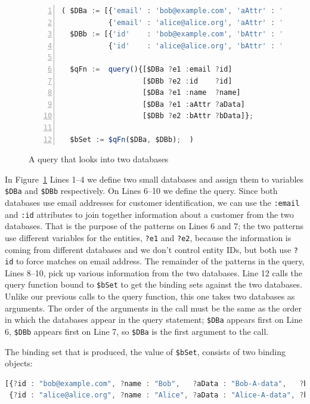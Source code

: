 \documentclass[10pt,letterpaper]{article} %
\newcommand{\stt}[1]{\texttt{#1}} %
\begin{document}
\begin{figure}[H]
    \caption{A query that looks into two databases}
    \label{code:two-database-query}
\begin{lstlisting}[language=JavaScript,numberstyle=\scriptsize,basicstyle=\ttfamily\scriptsize,numbers=left,stepnumber=1,breaklines=true]
( $DBa := [{'email' : 'bob@example.com', 'aAttr' : 'Bob-A-data',   'name' : 'Bob'},
           {'email' : 'alice@alice.org', 'aAttr' : 'Alice-A-data', 'name' : 'Alice'}];
  $DBb := [{'id'    : 'bob@example.com', 'bAttr' : 'Bob-B-data'},
           {'id'    : 'alice@alice.org', 'bAttr' : 'Alice-B-data'}];

  $qFn :=  query(){[$DBa ?e1 :email ?id]
                   [$DBb ?e2 :id    ?id]
                   [$DBa ?e1 :name  ?name]
                   [$DBa ?e1 :aAttr ?aData]
                   [$DBb ?e2 :bAttr ?bData]};

  $bSet := $qFn($DBa, $DBb);  )
\end{lstlisting}
  \end{figure} \vspace{-2em}

  In Figure~\ref{code:two-database-query} Lines 1--4 we define two small databases and assign them to variables \stt{\$DBa} and \stt{\$DBb} respectively. On Lines 6--10 we define the query.
Since both databases use email addresses for customer identification, we can use the \stt{:email} and \stt{:id} attributes to join together information about a customer from the two databases.
That is the purpose of the patterns on Lines 6 and 7; the two patterns use different variables for the entities, \stt{?e1} and \stt{?e2},
because the information is coming from different databases and we don't control entity IDs, but both use \stt{?id} to force
matches on email address.
The remainder of the patterns in the query, Lines 8--10, pick up various information from the two databases.
Line 12 calls the query function bound to \stt{\$bSet} to get the binding sets against the two databases.
Unlike our previous calls to the query function, this one takes two databases as arguments.
The order of the arguments in the call must be the same as the order in which the databases appear in the query statement;
\stt{\$DBa} appears first on Line 6, \stt{\$DBb} appears first on Line 7, so \stt{\$DBa} is the first argument to the call.

The binding set that is produced, the value of \stt{\$bSet}, consists of two binding objects:

\begin{lstlisting}[language=JavaScript,numbers=none,basicstyle=\ttfamily\scriptsize]
[{?id : "bob@example.com", ?name : "Bob",   ?aData : "Bob-A-data",   ?bData : "Bob-B-data"  },
 {?id : "alice@alice.org", ?name : "Alice", ?aData : "Alice-A-data", ?bData : "Alice-B-data"}]
\end{lstlisting} \vspace{-2em}
\end{document}
